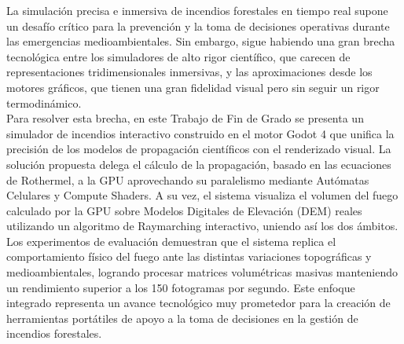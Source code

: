 \section*{}

\thispagestyle{empty}

\begin{center}
{\large\bfseries \myTitle}\\
\end{center}

\begin{center}
\myName\\
\end{center}



\vspace{0.7cm}
\\
La simulación precisa e inmersiva de incendios forestales en tiempo real supone un desafío crítico para la prevención y la toma de decisiones operativas durante las emergencias medioambientales. Sin embargo, sigue habiendo una gran brecha tecnológica entre los simuladores de alto rigor científico, que carecen de representaciones tridimensionales inmersivas, y las aproximaciones desde los motores gráficos, que tienen una gran fidelidad visual pero sin seguir un rigor termodinámico.\\

Para resolver esta brecha, en este Trabajo de Fin de Grado se presenta un simulador de incendios interactivo construido en el motor Godot 4 que unifica la precisión de los modelos de propagación científicos con el renderizado visual. La solución propuesta delega el cálculo de la propagación, basado en las ecuaciones de Rothermel, a la GPU aprovechando su paralelismo mediante Autómatas Celulares y Compute Shaders. A su vez, el sistema visualiza el volumen del fuego calculado por la GPU sobre Modelos Digitales de Elevación (DEM) reales utilizando un algoritmo de Raymarching interactivo, uniendo así los dos ámbitos. \\

Los experimentos de evaluación demuestran que el sistema replica el comportamiento físico del fuego ante las distintas variaciones topográficas y medioambientales, logrando procesar matrices volumétricas masivas manteniendo un rendimiento superior a los 150 fotogramas por segundo. Este enfoque integrado representa un avance tecnológico muy prometedor para la creación de herramientas portátiles de apoyo a la toma de decisiones en la gestión de incendios forestales.\\



